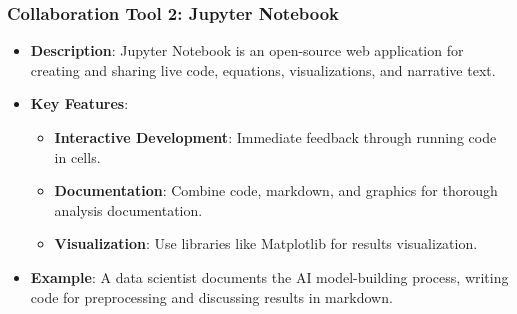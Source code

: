 \documentclass{beamer}
\begin{document}
\begin{frame}[fragile]
    \frametitle{Collaboration Tool 2: Jupyter Notebook}
    \begin{itemize}
        \item \textbf{Description}: Jupyter Notebook is an open-source web application for creating and sharing live code, equations, visualizations, and narrative text.
        \item \textbf{Key Features}:
            \begin{itemize}
                \item \textbf{Interactive Development}: Immediate feedback through running code in cells.
                \item \textbf{Documentation}: Combine code, markdown, and graphics for thorough analysis documentation.
                \item \textbf{Visualization}: Use libraries like Matplotlib for results visualization.
            \end{itemize}
        \item \textbf{Example}: A data scientist documents the AI model-building process, writing code for preprocessing and discussing results in markdown.
    \end{itemize}
\end{frame}
\end{document}
